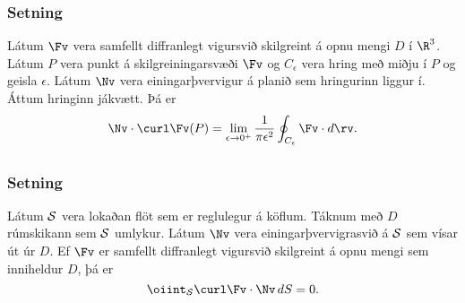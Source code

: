 \subsubsection{Setning \rtask{}}
 Látum $\Fv$ vera samfellt
diffranlegt vigursvið skilgreint á opnu mengi $D$ í $\R^3$.    Látum
$P$ vera punkt á skilgreiningarsvæði $\Fv$ og $C_\epsilon$ vera
hring með miðju í $P$ og geisla $\epsilon$.  Látum $\Nv$ vera
einingarþvervigur á planið sem hringurinn liggur í.  Áttum hringinn
jákvætt.
Þá er
$$\Nv\cdot\curl \Fv(P)=\lim_{\epsilon\rightarrow 0^+}
\frac{1}{\pi\epsilon^2}\oint_{C_\epsilon}\Fv\cdot d\rv.$$
   





\subsection{} 

\subsubsection{Setning \rtask{}}
Látum $\cal S$ vera lokaðan flöt sem er
reglulegur á köflum.  Táknum með $D$ rúmskikann sem $\cal S$ umlykur.
Látum $\Nv$ vera einingarþvervigrasvið á $\cal S$   sem vísar út úr
$D$.  Ef $\Fv$ er samfellt diffranlegt vigursvið skilgreint á opnu
mengi sem inniheldur $D$, 
þá er 
$$\oiint_{\cal S}\curl\Fv\cdot\Nv\,dS=0.$$




